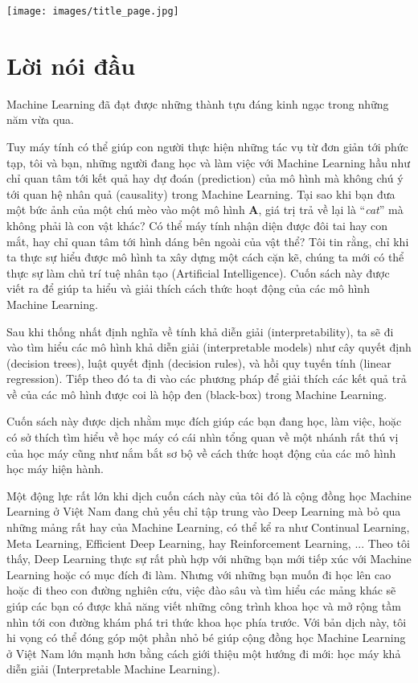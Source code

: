 \maketitle
\begin{figure*}[h!]
	\centering
	\texttt{[image: images/title\_page.jpg]}
\end{figure*}

\chapter*{Lời nói đầu}
Machine Learning đã đạt được những thành tựu đáng kinh ngạc trong những năm vừa qua. 

Tuy máy tính có thể giúp con người thực hiện những tác vụ từ đơn giản tới phức tạp, tôi và bạn, những người đang học và làm việc với Machine Learning hầu như chỉ quan tâm tới kết quả hay dự đoán (prediction) của mô hình mà không chú ý tới quan hệ nhân quả (causality) trong Machine Learning. Tại sao khi bạn đưa một bức ảnh của một chú mèo vào một mô hình \textbf{A}, giá trị trả về lại là ``\textit{cat}'' mà không phải là con vật khác? Có thể máy tính nhận diện được đôi tai hay con mắt, hay chỉ quan tâm tới hình dáng bên ngoài của vật thể? Tôi tin rằng, chỉ khi ta thực sự hiểu được mô hình ta xây dựng một cách cặn kẽ, chúng ta mới có thể thực sự làm chủ trí tuệ nhân tạo (Artificial Intelligence). Cuốn sách này được viết ra để giúp ta hiểu và giải thích cách thức hoạt động của các mô hình Machine Learning.

Sau khi thống nhất định nghĩa về tính khả diễn giải (interpretability), ta sẽ đi vào tìm hiểu các mô hình khả diễn giải (interpretable models) như cây quyết định (decision trees), luật quyết định (decision rules), và hồi quy tuyến tính (linear regression). Tiếp theo đó ta đi vào các phương pháp để giải thích các kết quả trả về của các mô hình được coi là hộp đen (black-box) trong Machine Learning.

Cuốn sách này được dịch nhằm mục đích giúp các bạn đang học, làm việc, hoặc có sở thích tìm hiểu về học máy có cái nhìn tổng quan về một nhánh rất thú vị của học máy cũng như nắm bắt sơ bộ về cách thức hoạt động của các mô hình học máy hiện hành.  

Một động lực rất lớn khi dịch cuốn cách này của tôi đó là cộng đồng học Machine Learning ở Việt Nam đang chủ yếu chỉ tập trung vào Deep Learning mà bỏ qua những mảng rất hay của Machine Learning, có thể kể ra như Continual Learning, Meta Learning, Efficient Deep Learning, hay Reinforcement Learning, ... Theo tôi thấy, Deep Learning thực sự rất phù hợp với những bạn mới tiếp xúc với Machine Learning hoặc có mục đích đi làm. Nhưng với những bạn muốn đi học lên cao hoặc đi theo con đường nghiên cứu, việc đào sâu và tìm hiểu các mảng khác sẽ giúp các bạn có được khả năng viết những công trình khoa học và mở rộng tầm nhìn tới con đường khám phá tri thức khoa học phía trước. Với bản dịch này, tôi hi vọng có thể đóng góp một phần nhỏ bé giúp cộng đồng học Machine Learning ở Việt Nam lớn mạnh hơn bằng cách giới thiệu một hướng đi mới: học máy khả diễn giải (Interpretable Machine Learning).

\clearpage
